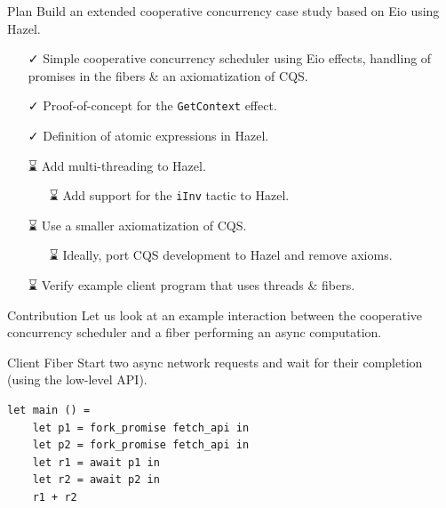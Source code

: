 \documentclass[aspectratio=43]{beamer}
\newcommand{\done}{{\symfontextra ✓}}
\newcommand{\tbd}{{\symfontextra ⌛}}
\begin{document}
\begin{frame}{Plan}
    Build an extended cooperative concurrency case study based on Eio using Hazel.
    \begin{itemize}
        \item[\done{}] Simple cooperative concurrency scheduler using Eio effects, handling of promises in the fibers \& an axiomatization of CQS.
        \item[\done{}] Proof-of-concept for the \texttt{GetContext} effect.
        \item[\done{}] Definition of atomic expressions in Hazel.
        \item[\tbd{}] Add multi-threading to Hazel.
            \begin{itemize}
                \item[\tbd{}] Add support for the \texttt{iInv} tactic to Hazel.
            \end{itemize}
        \item[\tbd{}] Use a smaller axiomatization of CQS.
            \begin{itemize}
                \item[\tbd{}] Ideally, port CQS development to Hazel and remove axioms.
            \end{itemize}
        \item[\tbd{}] Verify example client program that uses threads \& fibers.
    \end{itemize}
\end{frame}

\begin{frame}{Contribution}
    Let us look at an example interaction between the cooperative concurrency scheduler and a fiber performing an async computation.
\end{frame}

\begin{frame}[fragile]{Client Fiber}
    Start two async network requests and wait for their completion (using the low-level API).
    \begin{verbatim}
let main () = 
    let p1 = fork_promise fetch_api in
    let p2 = fork_promise fetch_api in
    let r1 = await p1 in 
    let r2 = await p2 in 
    r1 + r2
\end{verbatim}
\end{frame}
\end{document}
